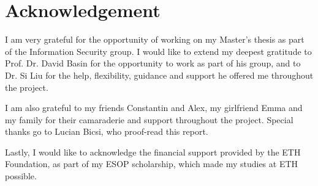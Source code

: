 
\section*{Acknowledgement}
I am very grateful for the opportunity of working on my Master's thesis as part of the Information Security group. I would like to extend my deepest gratitude to Prof. Dr. David Basin for the opportunity to work as part of his group, and to Dr. Si Liu for the help, flexibility, guidance and support he offered me throughout the project.  

I am also grateful to my friends Constantin and Alex, my girlfriend Emma and my family for their camaraderie and support throughout the project. Special thanks go to Lucian Bicsi, who proof-read this report.

Lastly, I would like to acknowledge the financial support provided by the ETH Foundation, as part of my ESOP scholarship, which made my studies at ETH possible.

